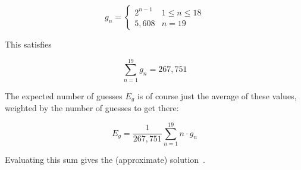 \documentclass{article}
\begin{document}
\[
g_{n}=
\begin{cases}
2^{n-1} & 1\leq n\leq18 \\
5,608   & n=19
\end{cases}
\]

This satisfies

\[
\sum_{n=1}^{19}g_{n}=267,751
\]

The expected number of guesses $E_{g}$ is of course just the average of these values, weighted by the number of guesses to get there:

\[
E_{g}=\frac{1}{267,751}\sum_{n=1}^{19}n\cdot g_{n}
\]

Evaluating this sum gives the (approximate) solution
\,.
\end{document}
